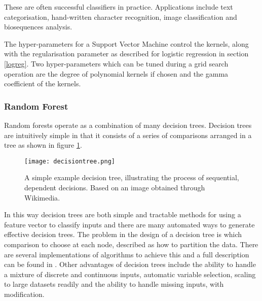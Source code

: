 These are often successful classifiers in practice.
Applications include text categorisation, hand-written character recognition, image classification and biosequences analysis\autocite{cristianini_introduction_2000}.

The hyper-parameters for a Support Vector Machine control the kernels, along with the regularisation parameter as described for logistic regression in section \ref{logreg}.
Two hyper-parameters which can be tuned during a grid search operation are the degree of polynomial kernels if chosen and the gamma coefficient of the kernels.


\subsubsection*{Random Forest}
\label{randomforest}

Random forests operate as a combination of many decision trees.
Decision trees are intuitively simple in that it consists of a series of comparisons arranged in a tree as shown in figure \ref{fig:dectree}.

\begin{figure}
    \centering
    \texttt{[image: decisiontree.png]}
    \caption{A simple example decision tree, illustrating the process of sequential, dependent decisions. Based on an image obtained through Wikimedia\autocite{wkmdacommons}.}
    \label{fig:dectree}
\end{figure}

In this way decision trees are both simple and tractable methods for using a feature vector to classify inputs and there are many automated ways to generate effective decision trees.
The problem in the design of a decision tree is which comparison to choose at each node, described as how to partition the data\autocite[544]{murphy_machine_2012}. %
There are several implementations of algorithms to achieve this and a full description can be found in \textcite[544]{murphy_machine_2012}.
Other advantages of decision trees include the ability to handle a mixture of discrete and continuous inputs, automatic variable selection, scaling to large datasets readily and the ability to handle missing inputs, with modification.


